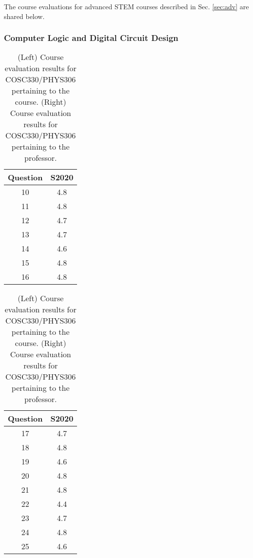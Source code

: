 \documentclass[../../main.tex]{subfiles}
\begin{document}
The course evaluations for advanced STEM courses described in Sec. \ref{sec:adv} are shared below.

\subsubsection{Computer Logic and Digital Circuit Design}

\begin{table}
\footnotesize
\centering
\begin{tabular}{| c | c |}
\hline
\hline
Question & S2020 \\ \hline
10 & 4.8 \\ \hline
11 & 4.8 \\ \hline
12 & 4.7 \\ \hline
13 & 4.7 \\ \hline
14 & 4.6 \\ \hline
15 & 4.8 \\ \hline
16 & 4.8 \\ \hline
\hline
\end{tabular}
\begin{tabular}{| c | c |}
\hline
\hline
Question & S2020 \\ \hline
17 & 4.7 \\ \hline
18 & 4.8 \\ \hline
19 & 4.6 \\ \hline
20 & 4.8 \\ \hline
21 & 4.8 \\ \hline
22 & 4.4 \\ \hline
23 & 4.7 \\ \hline
24 & 4.8 \\ \hline
25 & 4.6 \\ \hline
\hline
\end{tabular}
\caption{\label{tab:eval_330_306} (Left) Course evaluation results for COSC330/PHYS306 pertaining to the course.  (Right) Course evaluation results for COSC330/PHYS306 pertaining to the professor.}
\end{table}
\end{document}
